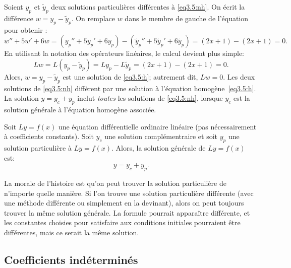 Soient $y_p$ et $\tilde{y}_p$ deux solutions particulières différentes à \eqref{eq3.5:nh}.
On écrit la différence
$w = y_p - \tilde{y}_p$.  On remplace $w$
dans le membre de gauche de l'équation pour obtenir : 
\begin{equation*}
	w'' + 5w'+ 6w 	= 	(y_p'' + 5y_p'+ 6y_p) - (\tilde{y}_p'' + 5\tilde{y}_p'+ 6\tilde{y}_p) 
					=	(2x+1) - (2x+1) = 0 .
\end{equation*}
En utilisant la notation des opérateurs linéaires, le calcul devient plus simple:  
\begin{equation*}
	Lw = L(y_p - \tilde{y}_p) =	Ly_p - L\tilde{y}_p = (2x+1)-(2x+1) = 0 .
\end{equation*}
Alors, $w = y_p - \tilde{y}_p$ est une solution de \eqref{eq3.5:h}; autrement dit,
$Lw = 0$.  Les deux solutions de \eqref{eq3.5:nh} diffèrent par une solution à l'équation homogène~\eqref{eq3.5:h}.  La solution  $y = y_c + y_p$ inclut \emph{toutes} les solutions de \eqref{eq3.5:nh}, 
lorsque $y_c$ est la solution générale à l'équation homogène associée. 

\begin{theorem}
	Soit $Ly=f(x)$ une équation différentielle ordinaire linéaire (pas nécessairement à coefficients constants).  Soit  $y_c$ une solution complémentraire et soit $y_p$ une solution particulière à $Ly=f(x)$.  
	Alors, la solution générale de $Ly=f(x)$ est: 
	\begin{equation*}
		y = y_c + y_p.
	\end{equation*}
\end{theorem}

La morale de l'histoire est qu'on peut trouver la solution particulière de n'importe quelle manière. 
Si l'on trouve une solution particulière différente (avec une méthode différente ou simplement en la devinant), alors on peut toujours trouver la même solution générale. 
La formule pourrait apparaître différente, et les constantes choisies pour satisfaire aux conditions initiales pourraient être différentes, mais ce serait la même solution.  



\subsection{Coefficients indéterminés}


